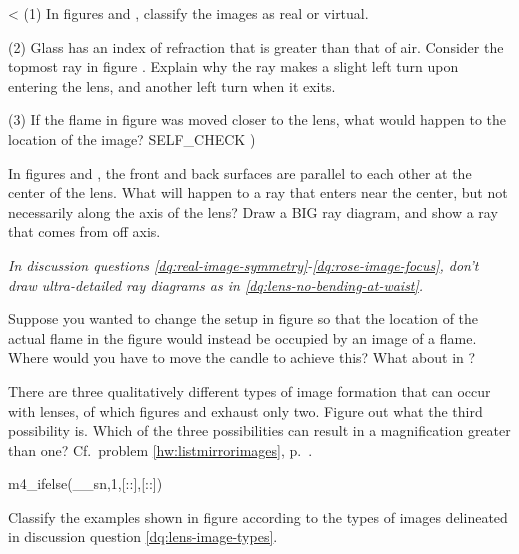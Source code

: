 <%
(1) In figures  and , classify the images as real or virtual.

(2) Glass has an index of refraction that is greater than
that of air. Consider the topmost ray in figure . Explain
why the ray makes a slight left turn upon entering the lens,
and another left turn when it exits.

(3) If the flame in figure  was moved closer to the lens,
what would happen to the location of the image?
  SELF_CHECK
  ) %

\startdqs

\begin{dq}\label{dq:lens-no-bending-at-waist}
In figures  and , the front and back surfaces are
parallel to each other at the center of the lens. What will
happen to a ray that enters near the center, but not
necessarily along the axis of the lens? Draw a BIG ray diagram,
and show a ray that comes from off axis.
\end{dq}

\emph{In discussion questions \ref{dq:real-image-symmetry}-\ref{dq:rose-image-focus}, don't draw ultra-detailed
ray diagrams as in \ref{dq:lens-no-bending-at-waist}.}

\begin{dq}\label{dq:real-image-symmetry}
Suppose you wanted to change the setup in figure  so
that the location of the actual flame in the figure would
instead be occupied by an image of a flame. Where would you
have to move the candle to achieve this? What about in ?
\end{dq}

\begin{dq}\label{dq:lens-image-types}
There are three qualitatively different types of image
formation that can occur with lenses, of which figures 
and  exhaust only two. Figure out what the third
possibility is. Which of the three possibilities can result
in a magnification greater than one? Cf.~problem \ref{hw:listmirrorimages}, p.~\pageref{hw:listmirrorimages}.
\end{dq}

m4_ifelse(__sn,1,[:\pagebreak:],[::])

\begin{dq}
Classify the examples shown in figure  according to
the types of images delineated in discussion question \ref{dq:lens-image-types}.
\end{dq}

